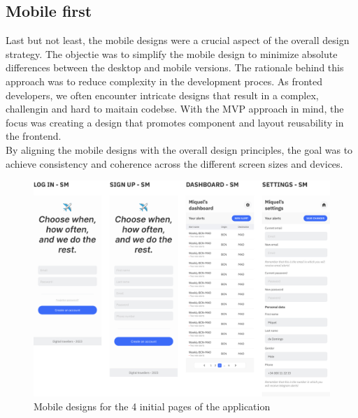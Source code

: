 \documentclass[./memory.tex]{subfiles}
\begin{document}
\subsection{Mobile first}
Last but not least, the mobile designs were a crucial aspect of the overall
design strategy. The objectie was to simplify the mobile design to minimize
absolute differences between the desktop and mobile versions. The rationale
behind this approach was to reduce complexity in the development proces. As
fronted developers, we often encounter intricate designs that result in a
complex, challengin and hard to maitain codebse. With the MVP approach in mind,
the focus was creating a design that promotes component and layout reusability
in the frontend.
\\[8pt]
By aligning the mobile designs with the overall design principles, the goal was
to achieve consistency and coherence across the different screen sizes and
devices.
\begin{figure}[H]
	\centering
	\includegraphics[width=\textwidth]{./assets/designs/design-sm.png}
	\caption{Mobile designs for the 4 initial pages of the application}
\end{figure}
\end{document}
